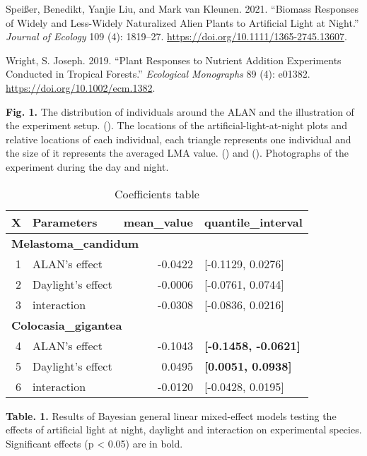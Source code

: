 \documentclass[
]{article}
\newlength{\cslhangindent}
\newlength{\cslentryspacingunit} %
\newenvironment{CSLReferences}[2] %
 {%
  \setlength{\parindent}{0pt}
  \ifodd #1
  \let\oldpar\par
  \def\par{\hangindent=\cslhangindent\oldpar}
  \fi
  \setlength{\parskip}{#2\cslentryspacingunit}
 }%
 {}
\begin{document}
\begin{CSLReferences}{1}{0}
\leavevmode{}%
Speißer, Benedikt, Yanjie Liu, and Mark van Kleunen. 2021. {``Biomass
Responses of Widely and Less-Widely Naturalized Alien Plants to
Artificial Light at Night.''} \emph{Journal of Ecology} 109 (4):
1819--27. \url{https://doi.org/10.1111/1365-2745.13607}.

\leavevmode{}%
Wright, S. Joseph. 2019. {``Plant Responses to Nutrient Addition
Experiments Conducted in Tropical Forests.''} \emph{Ecological
Monographs} 89 (4): e01382. \url{https://doi.org/10.1002/ecm.1382}.

\end{CSLReferences}

\newpage

\textbf{Fig. 1.} The distribution of individuals around the ALAN and the
illustration of the experiment setup. (). The locations of the
artificial-light-at-night plots and relative locations of each
individual, each triangle represents one individual and the size of it
represents the averaged LMA value. () and (). Photographs of the
experiment during the day and night.

\newpage

\begin{table}

\caption{\label{tab:table}Coefficients table}
\centering
\begin{tabular}[t]{r|l|r|>{}l}
\hline
X & Parameters & mean\_value & quantile\_interval\\
\hline
\multicolumn{4}{l}{\textbf{Melastoma\_candidum}}\\
\hline
\hspace{1em}1 & ALAN's effect & -0.0422 & [-0.1129, 0.0276]\\
\hline
\hspace{1em}2 & Daylight's effect & -0.0006 & [-0.0761, 0.0744]\\
\hline
\hspace{1em}3 & interaction & -0.0308 & [-0.0836, 0.0216]\\
\hline
\multicolumn{4}{l}{\textbf{Colocasia\_gigantea}}\\
\hline
\hspace{1em}4 & ALAN's effect & -0.1043 & \textbf{[-0.1458, -0.0621]}\\
\hline
\hspace{1em}5 & Daylight's effect & 0.0495 & \textbf{[0.0051, 0.0938]}\\
\hline
\hspace{1em}6 & interaction & -0.0120 & [-0.0428, 0.0195]\\
\hline
\end{tabular}
\end{table}

\textbf{Table. 1.} Results of Bayesian general linear mixed-effect
models testing the effects of artificial light at night, daylight and
interaction on experimental species. Significant effects (p \textless{}
0.05) are in bold.

\newpage
\end{document}
